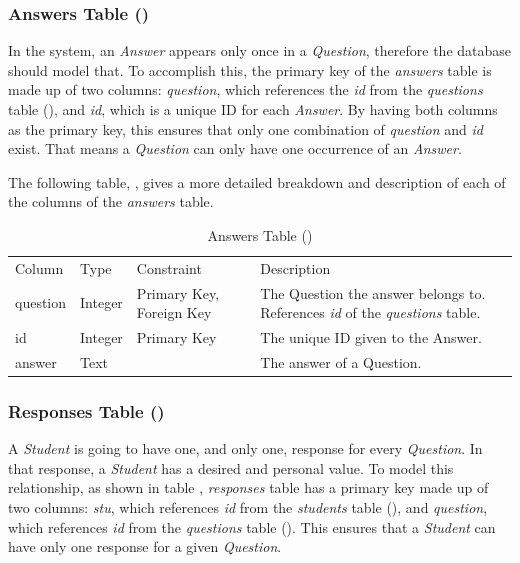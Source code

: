 \documentclass[12pt,letterpaper]{article}
\begin{document}
\subsubsection*{Answers Table ()}
In the system, an \textit{Answer} appears only once in a \textit{Question}, therefore the database should model that. To accomplish this, the primary key of the \textit{answers} table is made up of two columns: \textit{question}, which references the \textit{id} from the \textit{questions} table (), and \textit{id}, which is a unique ID for each \textit{Answer}. By having both columns as the primary key, this ensures that only one combination of \textit{question} and \textit{id} exist. That means a \textit{Question} can only have one occurrence of an \textit{Answer}.

The following table, , gives a more detailed breakdown and description of each of the columns of the \textit{answers} table.

\begin{table}[H]
	\caption{Answers Table ()} 
	\begin{tabu} to \textwidth {l l X X[4]}
		\tableheader{}Column & Type & Constraint & Description \\
		question & Integer & Primary Key,\newline
		                     Foreign Key          & The Question the answer belongs to. References \textit{id} of the 
		                                            \textit{questions} table. \\
		id       & Integer & Primary Key          & The unique ID given to the Answer. \\
		answer   & Text    &                      & The answer of a Question. \\
	\end{tabu}
\end{table}

\subsubsection*{Responses Table ()}
A \textit{Student} is going to have one, and only one, response for every \textit{Question}. In that response, a \textit{Student} has a desired and personal value. To model this relationship, as shown in table , \textit{responses} table has a primary key made up of two columns: \textit{stu}, which references \textit{id} from the \textit{students} table (), and \textit{question}, which references \textit{id} from the \textit{questions} table (). This ensures that a \textit{Student} can have only one response for a given \textit{Question}.
\end{document}
